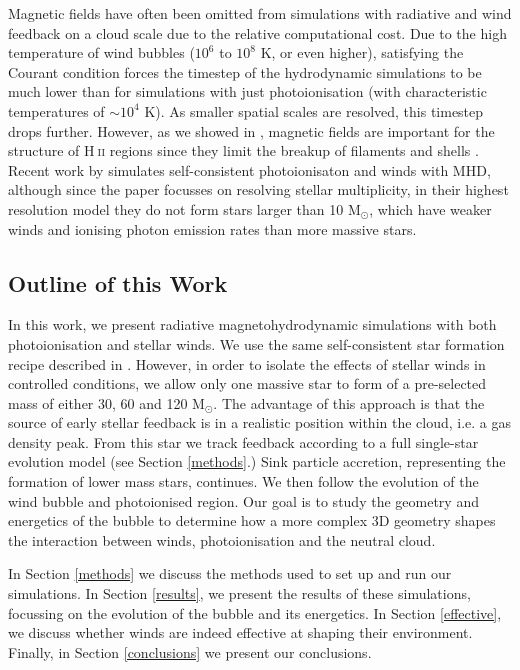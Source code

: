 \documentclass[a4paper,fleqn,usenatbib]{mnras}
\newcommand{\Msolar}{M$_{\odot}$\xspace}
\newcommand{\HII}{H$~$\textsc{ii}\xspace}
\begin{document}
Magnetic fields have often been omitted from simulations with radiative and wind feedback on a cloud scale due to the relative computational cost. Due to the high temperature of wind bubbles ($10^6$ to $10^8$ K, or even higher), satisfying the Courant condition forces the timestep of the hydrodynamic simulations to be much lower than for simulations with just photoionisation (with characteristic temperatures of $\sim10^4$ K). As smaller spatial scales are resolved, this timestep drops further. However, as we showed in \cite{Geen2015b}, magnetic fields are important for the structure of \HII regions since they limit the breakup of filaments and shells \citep[see also][]{Hennebelle2013}. Recent work by \cite{Wall2019} simulates self-consistent photoionisaton and winds with MHD, although since the paper focusses on resolving stellar multiplicity, in their highest resolution model they do not form stars larger than 10 \Msolar, which have weaker winds and ionising photon emission rates than more massive stars.

\subsection{Outline of this Work}

In this work, we present radiative magnetohydrodynamic simulations with both photoionisation and stellar winds. We use the same self-consistent star formation recipe described in \cite{Geen2018}. However, in order to isolate the effects of stellar winds in controlled conditions, we allow only one massive star to form of a pre-selected mass of either 30, 60 and 120 \Msolar. The advantage of this approach is that the source of early stellar feedback is in a realistic position within the cloud, i.e. a gas density peak. From this star we track feedback according to a full single-star evolution model (see Section \ref{methods}.) Sink particle accretion, representing the formation of lower mass stars, continues. We then follow the evolution of the wind bubble and photoionised region. Our goal is to study the geometry and energetics of the bubble to determine how a more complex 3D geometry shapes the interaction between winds, photoionisation and the neutral cloud.

In Section \ref{methods} we discuss the methods used to set up and run our simulations. In Section \ref{results}, we present the results of these simulations, focussing on the evolution of the bubble and its energetics. In Section \ref{effective}, we discuss whether winds are indeed effective at shaping their environment. Finally, in Section \ref{conclusions} we present our conclusions.
\end{document}
